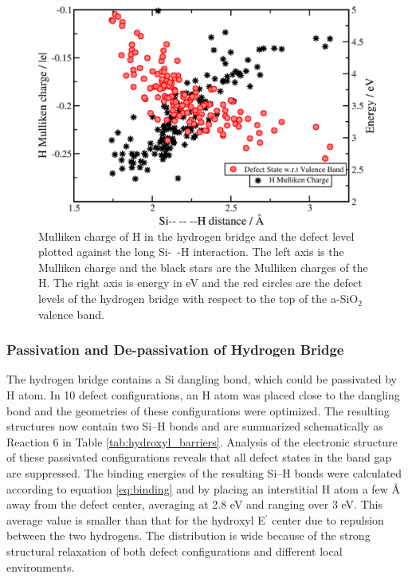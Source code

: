 \documentclass[aps,prb,reprint,superscriptaddress,showpacs]{revtex4-1}
\begin{document}
\begin{figure}[h!]
\includegraphics{hbridge_analysis.png}
\caption{Mulliken charge of H in the hydrogen bridge and the defect level plotted against the long \mbox{Si- -H} interaction. The left axis is the Mulliken charge and the black stars are the Mulliken charges of the H. The right axis is energy in eV and the red circles are the defect levels of the hydrogen bridge with respect to the top of the a-SiO$_2$ valence band.} 
\label{fig:hbridge_correlation}
\end{figure}


\subsubsection{Passivation and De-passivation of Hydrogen Bridge}

The hydrogen bridge contains a Si dangling bond, which could be passivated by H atom. In 10 defect configurations, an H atom was placed close to the dangling bond and the geometries of these configurations were optimized. The resulting structures now contain two \mbox{Si--H} bonds and are summarized schematically as Reaction 6 in Table \ref{tab:hydroxyl_barriers}. Analysis of the electronic structure of these passivated configurations reveals that all defect states in the band gap are suppressed. The binding energies of the resulting \mbox{Si--H} bonds were calculated according to equation \ref{eq:binding} and by placing an interstitial H atom a few {\AA} away from the defect center, averaging at 2.8 eV and ranging over 3 eV. This average value is smaller than that for the hydroxyl E$^\prime$ center due to repulsion between the two hydrogens. The distribution is wide because of the strong structural relaxation of both defect configurations and different local environments.
\end{document}
